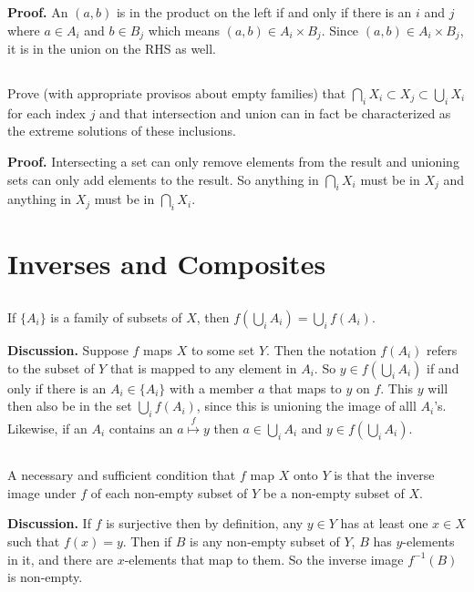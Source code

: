 \documentclass{article}
\begin{document}
\textbf{Proof.} An $(a, b)$ is in the product on the left if and only if there is an $i$ and $j$ where $a \in A_i$ and $b \in B_j$ which means $(a, b) \in A_i \times B_j$. Since $(a, b) \in A_i \times B_j$, it is in the union on the RHS as well.

\subsection{} Prove (with appropriate provisos about empty families) that $\bigcap_i X_i \subset X_j \subset \bigcup_i X_i$ for each index $j$ and that intersection and union can in fact be characterized as the extreme solutions of these inclusions.

\textbf{Proof.} Intersecting a set can only remove elements from the result and unioning sets can only add elements to the result. So anything in $\bigcap_i X_i $ must be in $X_j$ and anything in $X_j$ must be in $\bigcap_i X_i$.

\section{Inverses and Composites}

\subsection{} If $\{A_i\}$ is a family of subsets of $X$, then $f\left(\bigcup_i A_i\right) = \bigcup_i f(A_i)$.

\textbf{Discussion.} Suppose $f$ maps $X$ to some set $Y$. Then the notation $f(A_i)$ refers to the subset of $Y$ that is mapped to any element in $A_i$. So $y \in f\left(\bigcup_i A_i\right)$ if and only if there is an $A_i \in \{A_i\}$ with a member $a$ that maps to $y$ on $f$. This $y$ will then also be in the set $\bigcup_i f(A_i)$, since this is unioning the image of alll $A_i$'s. Likewise, if an $A_i$ contains an $a \stackrel{f}{\longmapsto} y$ then $a \in \bigcup_i A_i$ and $y \in f\left(\bigcup_i A_i \right)$. 

\subsection{} A necessary and sufficient condition that $f$ map $X$ onto $Y$ is that the inverse image under $f$ of each non-empty subset of $Y$ be a non-empty subset of $X$.

\textbf{Discussion.} If $f$ is surjective then by definition, any $y \in Y$ has at least one $x \in X$ such that $f(x) = y$. Then if $B$ is any non-empty subset of $Y$, $B$ has $y$-elements in it, and there are $x$-elements that map to them. So the inverse image $f^{-1}(B)$ is non-empty.
\end{document}
